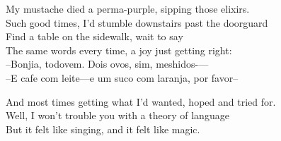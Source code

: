 My mustache died a perma-purple, sipping those elixirs. \\
Such good times, I'd stumble downstairs past the doorguard \\
Find a table on the sidewalk, wait to say \\
The same words every time, a joy just getting right: \\
--Bonjia, todovem. Dois ovos, sim, meshidos-— \\
--E cafe com leite—e um suco com laranja, por favor--

And most times getting what I'd wanted, hoped and tried for. \\
Well, I won't trouble you with a theory of language \\
But it felt like singing, and it felt like magic. 